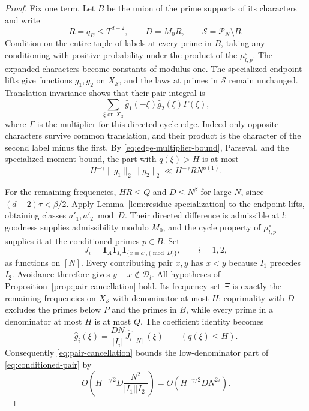 \begin{proof}
Fix one term.  Let $B$ be the union of the prime supports of its
characters and write
\[
 R=q_B\le T^{d-2},\qquad D=M_0R,\qquad
 \mathcal S=\mathcal P_N\setminus B.
\]
Condition on the entire tuple of labels at every prime in $B$, taking
any conditioning with positive probability under the product of the
$\mu_{l,p}^\circ$.  The expanded characters become constants of modulus
one.  The specialized endpoint lifts give functions $g_1,g_2$ on
$X_{\mathcal S}$, and the laws at primes in $\mathcal S$ remain unchanged.
Translation invariance shows that their pair integral is
\begin{equation}\label{eq:conditioned-pair}
 \sum_{\xi\text{ on }X_{\mathcal S}}
       \widehat g_1(-\xi)\widehat g_2(\xi)\Gamma(\xi),
\end{equation}
where $\Gamma$ is the multiplier for this directed cycle edge.  Indeed
only opposite characters survive common translation, and their product
is the character of the second label minus the first.
By \eqref{eq:edge-multiplier-bound}, Parseval, and the specialized moment
bound, the part with $q(\xi)>H$ is at most
\begin{equation}\label{eq:conditioned-pair-tail}
 H^{-\gamma}\|g_1\|_2\|g_2\|_2
       \ll H^{-\gamma}R N^{o(1)}.
\end{equation}

For the remaining frequencies, $HR\le Q$ and $D\le N^\beta$ for large
$N$, since $(d-2)\tau<\beta/2$.  Apply
Lemma~\ref{lem:residue-specialization} to the endpoint lifts, obtaining
classes $a'_1,a'_2\bmod D$.  Their directed difference is admissible at
$l$: goodness supplies admissibility modulo $M_0$, and the cycle
property of $\mu_{l,p}^\circ$ supplies it at the conditioned primes
$p\in B$.
Set
\[
 J_i=\mathbf1_A\mathbf1_{I_i}\mathbf1_{\{x\equiv a'_i\pmod D\}},
 \qquad i=1,2,
\]
as functions on $[N]$.  Every contributing pair $x,y$ has $x<y$ because
$I_1$ precedes $I_2$.  Avoidance therefore gives
$y-x\notin\mathcal D_l$.  All hypotheses of
Proposition~\ref{prop:pair-cancellation} hold.
Its frequency set $\Xi$ is exactly the remaining frequencies on
$X_{\mathcal S}$ with denominator at most $H$: coprimality with $D$
excludes the primes below $P$ and the primes in $B$, while every prime
in a denominator at most $H$ is at most $Q$.
The coefficient identity becomes
\[
 \widehat g_i(\xi)=\frac{DN}{|I_i|}\widehat{J_i}_{[N]}(\xi)
 \qquad(q(\xi)\le H).
\]
Consequently \eqref{eq:pair-cancellation} bounds the low-denominator
part of \eqref{eq:conditioned-pair} by
\begin{equation}\label{eq:conditioned-pair-main}
 O\left(H^{-\gamma/2}D\frac{N^2}{|I_1||I_2|}\right)
       =O(H^{-\gamma/2}DN^{2\tau}).
\end{equation}


\end{proof}
